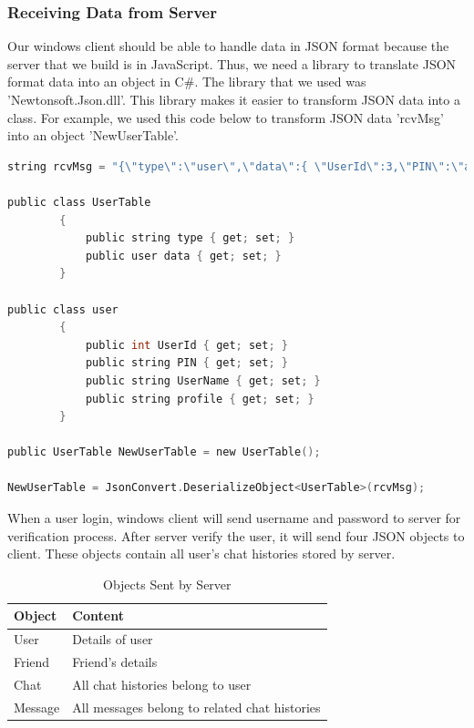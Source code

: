 \documentclass[a4paper,11pt]{article}
\begin{document}
\subsubsection{Receiving Data from Server}

	Our windows client should be able to handle data in JSON format because the server that we build is in JavaScript. Thus, we need a library to translate JSON format data into an object in C\#. The library that we used was 'Newtonsoft.Json.dll'. This library makes it easier to transform JSON data into a class. For example, we used this code below to transform JSON data 'rcvMsg' into an object 'NewUserTable'.

\begin{lstlisting}[language=C]
string rcvMsg = "{\"type\":\"user\",\"data\":{ \"UserId\":3,\"PIN\":\"admin\",\"UserName\":\"peggy\",\"profile\":\"assets / dist / images / 5.jpg\"}}";

public class UserTable
        {
            public string type { get; set; }
            public user data { get; set; }
        }

public class user
        {
            public int UserId { get; set; }
            public string PIN { get; set; }
            public string UserName { get; set; }
            public string profile { get; set; }
        }
        
public UserTable NewUserTable = new UserTable();

NewUserTable = JsonConvert.DeserializeObject<UserTable>(rcvMsg);
\end{lstlisting}

When a user login, windows client will send username and password to server for verification process. After server verify the user, it will send four JSON objects to client. These objects contain all user's chat histories stored by server.

\begin{table}
\centering
\begin{tabular}{l|l}
\hline
Object & Content  \\\hline
User & Details of user  \\\hline
Friend & Friend's details  \\\hline
Chat & All chat histories belong to user  \\\hline
Message & All messages belong to related chat histories  \\\hline
\end{tabular}
\caption{\label{tab:json}Objects Sent by Server}
\end{table}
\end{document}
